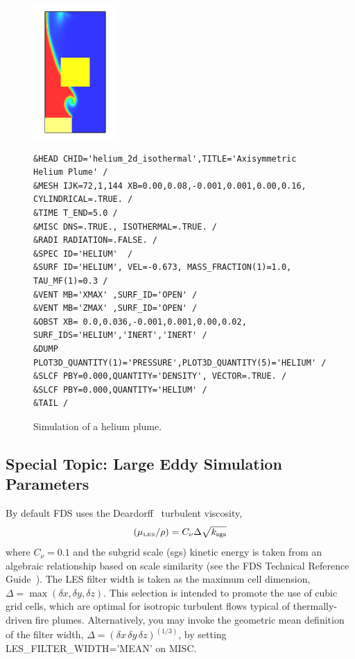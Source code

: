 \documentclass[11pt]{book}
\begin{document}
\begin{figure}[ht]
\noindent
\begin{minipage}{1.1in}
\includegraphics[height=2in]{SCRIPT_FIGURES/helium_2d_isothermal}
\end{minipage}
\hfill
\begin{minipage}{5.5in}
\begin{lstlisting}[basicstyle=\scriptsize\ttfamily]
&HEAD CHID='helium_2d_isothermal',TITLE='Axisymmetric Helium Plume' /
&MESH IJK=72,1,144 XB=0.00,0.08,-0.001,0.001,0.00,0.16, CYLINDRICAL=.TRUE. /
&TIME T_END=5.0 /
&MISC DNS=.TRUE., ISOTHERMAL=.TRUE. /
&RADI RADIATION=.FALSE. /
&SPEC ID='HELIUM'  /
&SURF ID='HELIUM', VEL=-0.673, MASS_FRACTION(1)=1.0, TAU_MF(1)=0.3 /
&VENT MB='XMAX' ,SURF_ID='OPEN' /
&VENT MB='ZMAX' ,SURF_ID='OPEN' /
&OBST XB= 0.0,0.036,-0.001,0.001,0.00,0.02, SURF_IDS='HELIUM','INERT','INERT' /
&DUMP PLOT3D_QUANTITY(1)='PRESSURE',PLOT3D_QUANTITY(5)='HELIUM' /
&SLCF PBY=0.000,QUANTITY='DENSITY', VECTOR=.TRUE. /
&SLCF PBY=0.000,QUANTITY='HELIUM' /
&TAIL /
\end{lstlisting}
\end{minipage}
\caption[Snapshot of the {\ct helium\_2d\_isothermal} test case]{Simulation of a helium plume.}
\label{helium_plume}
\end{figure}

\subsection{Special Topic: Large Eddy Simulation Parameters}
\label{info:LES}

By default FDS uses the Deardorff~\cite{Deardorff:1980,Pope:2000} turbulent viscosity,
\begin{equation}
(\mu_{\hbox{\tiny LES}}/\rho) = C_\nu \Delta \sqrt{k_{\rm sgs}}
\end{equation}
where $C_\nu=0.1$ and the subgrid scale (sgs) kinetic energy is taken from an algebraic relationship based on scale similarity (see the FDS Technical Reference Guide~\cite{FDS_Math_Guide}). The LES filter width is taken as the maximum cell dimension, $\Delta = \max(\delta x,\delta y,\delta z)$.  This selection is intended to promote the use of cubic grid cells, which are optimal for isotropic turbulent flows typical of thermally-driven fire plumes.  Alternatively, you may invoke the geometric mean definition of the filter width, $\Delta = (\delta x\, \delta y\, \delta z)^{(1/3)}$, by setting {\ct LES\_FILTER\_WIDTH='MEAN'} on {\ct MISC}.
\end{document}

